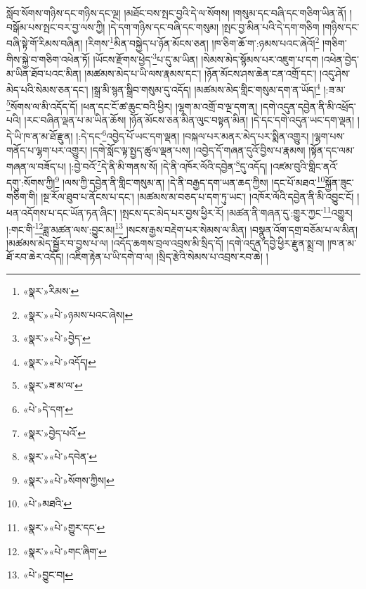 སློབ་སོགས་གཉིས་དང་གཉིས་དང་ལྔ། །མཐོང་བས་སྤང་བྱའི་དེ་ལ་སོགས། །གསུམ་དང་བཞི་དང་གཅིག་ཡིན་ནོ། །བསྒོམ་པས་སྤང་བར་བྱ་ལས་ཀྱི། །དེ་དག་གཉིས་དང་བཞི་དང་གསུམ། །སྤང་བྱ་མིན་པའི་དེ་དག་གཅིག །གཉིས་དང་བཞི་སྟེ་གོ་རིམས་བཞིན། །རིགས་\footnote{«སྣར་»རིམས་}མིན་བསྐྱེད་པ་ཉོན་མོངས་ཅན། །ཁ་ཅིག་ཆོ་ག་:ཉམས་པའང་ཞེའོ།\footnote{«སྣར་»«པེ་»ཉམས་པའང་ཞེས།} །གཅིག་གིས་སྐྱེ་བ་གཅིག་འཕེན་ཏོ། །ཡོངས་རྫོགས་ཕྱེད་\footnote{«སྣར་»«པེ་»བྱེད་}པ་དུ་མ་ཡིན། །སེམས་མེད་སྙོམས་པར་འཇུག་པ་དག །འཕེན་བྱེད་མ་ཡིན་ཐོབ་པའང་མིན། །མཚམས་མེད་པ་ཡི་ལས་རྣམས་དང་། །ཉོན་མོངས་ཤས་ཆེན་ངན་འགྲོ་དང་། །འདུ་ཤེས་མེད་པའི་སེམས་ཅན་དང་། །སྒྲ་མི་སྙན་སྒྲིབ་གསུམ་དུ་འདོད། །མཚམས་མེད་གླིང་གསུམ་དག་ན་ཡོད།\footnote{«སྣར་»«པེ་»འདོད།} །:ཟ་མ་\footnote{«སྣར་»ཟ་མ་ལ་}སོགས་ལ་མི་འདོད་དོ། །ཕན་དང་ངོ་ཚ་ཆུང་བའི་ཕྱིར། །ལྷག་མ་འགྲོ་བ་ལྔ་དག་ན། །དགེ་འདུན་དབྱེན་ནི་མི་འཕྲོད་པའི། །རང་བཞིན་ལྡན་པ་མ་ཡིན་ཆོས། །ཉོན་མོངས་ཅན་མིན་ལུང་བསྟན་མིན། །དེ་དང་དགེ་འདུན་ཡང་དག་ལྡན། །དེ་ཡི་ཁ་ན་མ་ཐོ་རྫུན། །:དེ་དང་\footnote{«པེ་»དེ་དག་}འབྱེད་པོ་ཡང་དག་ལྡན། །བསྐལ་པར་མནར་མེད་པར་སྨིན་འགྱུར། །ལྷག་པས་གནོད་པ་ལྷག་པར་འགྱུར། །དགེ་སློང་ལྟ་སྤྱད་ཚུལ་ལྡན་པས། །འབྱེད་དོ་གཞན་དུའོ་བྱིས་པ་རྣམས། །སྟོན་དང་ལམ་གཞན་ལ་བཟོད་པ། །:བྱེ་བའོ་\footnote{«སྣར་»བྱེད་པའོ་}དེ་ནི་མི་གནས་སོ། །དེ་ནི་འཁོར་ལོའི་དབྱེན་\footnote{«སྣར་»«པེ་»དབེན་}དུ་འདོད། །འཛམ་བུའི་གླིང་ནའོ་དགུ་:སོགས་ཀྱི།\footnote{«སྣར་»«པེ་»སོགས་ཀྱིས།} །ལས་ཀྱི་དབྱེན་ནི་གླིང་གསུམ་ན། །དེ་ནི་བརྒྱད་དག་ཡན་ཆད་ཀྱིས། །དང་པོ་མཐའ་\footnote{«པེ་»མཐའི་}སྐྱོན་ཟུང་གཅིག་གི། །སྔ་རོལ་ཐུབ་པ་ནོངས་པ་དང་། །མཚམས་མ་བཅད་པ་དག་ཏུ་ཡང་། །འཁོར་ལོའི་དབྱེན་ནི་མི་འབྱུང་ངོ། །ཕན་འདོགས་པ་དང་ཡོན་ཏན་ཞིང་། །སྤངས་དང་མེད་པར་བྱས་ཕྱིར་རོ། །མཚན་ནི་གཞན་དུ་:གྱུར་ཀྱང་\footnote{«སྣར་»«པེ་»གྱུར་དང་}འགྱུར། །:གང་གི་\footnote{«སྣར་»«པེ་»གང་ཞིག་}ཟླ་མཚན་ལས་:བྱུང་མ།\footnote{«པེ་»བྱུང་བ།} །སངས་རྒྱས་བརྡེག་པར་སེམས་ལ་མིན། །བསྣུན་འོག་དགྲ་བཅོམ་པ་ལ་མིན། །མཚམས་མེད་སྦྱོར་བ་བྱས་པ་ལ། །འདོད་ཆགས་བྲལ་འབྲས་མི་སྲིད་དོ། །དགེ་འདུན་དབྱེ་ཕྱིར་རྫུན་སྨྲ་བ། །ཁ་ན་མ་ཐོ་རབ་ཆེར་འདོད། །འཇིག་རྟེན་པ་ཡི་དགེ་བ་ལ། །སྲིད་རྩེའི་སེམས་པ་འབྲས་རབ་ཆེ། །
